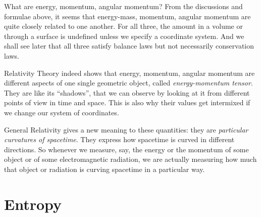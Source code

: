 \documentclass[a4paper,12pt,%
onecolumn,oneside,%
british%
]{memoir}
\newcommand{\mynotew}[1]{{\footnotesize\color{midgrey}\faIcon{tools}\ #1}}
\renewcommand*{\|}[1][]{\nonscript\:#1\vert\nonscript\:\mathopen{}}
\newcommand*{\sect}{\S}%
\newcommand*{\energym}{energy-mass}
\begin{document}
\begin{extra}{{What are energy, momentum, angular momentum?}}
From the discussions and formulae above, it seems that \energym, momentum, angular momentum are quite closely related to one another. For all three, the amount in a volume or through a surface is undefined unless we specify a coordinate system. And we shall see later that all three satisfy balance laws but not necessarily conservation laws.

  Relativity Theory indeed shows that energy, momentum, angular momentum are different aspects of one single geometric object, called \emph{energy-momentum tensor}. They are like its \enquote{shadows}, that we can observe by looking at it from different points of view in time and space. This is also why their values get intermixed if we change our system of coordinates. %

  General Relativity gives a new meaning to these quantities: they are \emph{particular curvatures of spacetime}. They express how spacetime is curved in different directions. So whenever we measure, say, the energy or the momentum of some object or of some electromagnetic radiation, we are actually measuring how much that object or radiation is curving spacetime in a particular way. %
\end{extra}
%

\section{Entropy}
\label{sec:intro_entropy}
\end{document}
